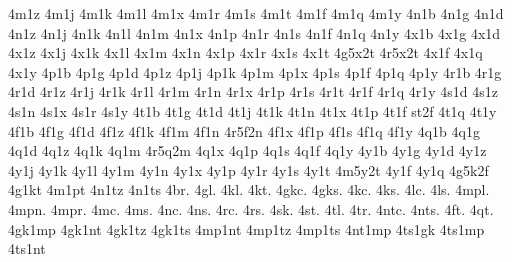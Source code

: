 {4m1z
4m1j
4m1k
4m1l
4m1x
4m1r
4m1s
4m1t
4m1f
4m1q
4m1y
4n1b
4n1g
4n1d
4n1z
4n1j
4n1k
4n1l
4n1m
4n1x
4n1p
4n1r
4n1s
4n1f
4n1q
4n1y
4x1b
4x1g
4x1d
4x1z
4x1j
4x1k
4x1l
4x1m
4x1n
4x1p
4x1r
4x1s
4x1t
4g5x2t %
4r5x2t %
4x1f
4x1q
4x1y
4p1b
4p1g
4p1d
4p1z
4p1j
4p1k
4p1m
4p1x
4p1s
4p1f
4p1q
4p1y
4r1b
4r1g
4r1d
4r1z
4r1j
4r1k
4r1l
4r1m
4r1n
4r1x
4r1p
4r1s
4r1t
4r1f
4r1q
4r1y
4s1d %
4s1z 
4s1n %
4s1x
4s1r
4s1y
4t1b
4t1g
4t1d
4t1j
4t1k 
4t1n
4t1x
4t1p
4t1f
st2f %
4t1q
4t1y
4f1b
4f1g
4f1d
4f1z 
4f1k %
4f1m 
4f1n
4r5f2n %
4f1x
4f1p
4f1s
4f1q
4f1y
4q1b
4q1g
4q1d
4q1z
4q1k
4q1m
4r5q2m %
4q1x
4q1p
4q1s
4q1f
4q1y
4y1b
4y1g
4y1d
4y1z
4y1j
4y1k
4y1l
4y1m
4y1n
4y1x
4y1p
4y1r
4y1s
4y1t
4m5y2t %
4y1f
4y1q
4g5k2f %
4g1kt  %
4m1pt  %
4n1tz  %
4n1ts  %
4br.  %
4gl.  %
4kl.  %
4kt.  %
4gkc. %
4gks.
4kc.  %
4ks.
4lc.  %
4ls.
4mpl. %
4mpn. %
4mpr. %
4mc.  %
4ms.
4nc.  %
4ns.
4rc.  %
4rs.
4sk.  %
4st.  %
4tl.  %
4tr.  %
4ntc. %
4nts.
4ft.  %
4qt.  %
4gk1mp
4gk1nt
4gk1tz
4gk1ts
4mp1nt
4mp1tz
4mp1ts
4nt1mp
4ts1gk
4ts1mp
4ts1nt
} %
\endgroup
\endinput
